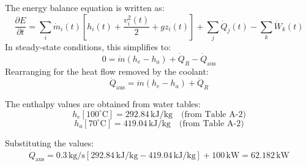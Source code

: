 The energy balance equation is written as:  
\[
\frac{\partial E}{\partial t} = \sum_i \dot{m}_i(t) \left[ h_i(t) + \frac{v_i^2(t)}{2} + g z_i(t) \right] + \sum_j \dot{Q}_j(t) - \sum_k \dot{W}_k(t)
\]  
In steady-state conditions, this simplifies to:  
\[
0 = \dot{m} (h_e - h_a) + \dot{Q}_R - \dot{Q}_{\text{aus}}
\]  
Rearranging for the heat flow removed by the coolant:  
\[
\dot{Q}_{\text{aus}} = \dot{m} (h_e - h_a) + \dot{Q}_R
\]  

The enthalpy values are obtained from water tables:  
\[
h_e[100^\circ\text{C}] = 292.84 \, \text{kJ/kg} \quad \text{(from Table A-2)}
\]  
\[
h_a[70^\circ\text{C}] = 419.04 \, \text{kJ/kg} \quad \text{(from Table A-2)}
\]  

Substituting the values:  
\[
\dot{Q}_{\text{aus}} = 0.3 \, \text{kg/s} \left[ 292.84 \, \text{kJ/kg} - 419.04 \, \text{kJ/kg} \right] + 100 \, \text{kW} = 62.182 \, \text{kW}
\]
